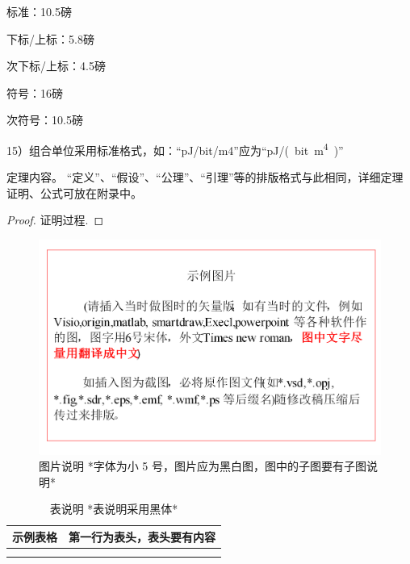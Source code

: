 \documentclass{cjc}
\begin{document}
标准：10.5磅

下标/上标：5.8磅

次下标/上标：4.5磅

符号：16磅

次符号：10.5磅

15）组合单位采用标准格式，如：“pJ/bit/m4”应为“\si{pJ/(bit.m^4)}”


\begin{theorem}
  定理内容。
  “定义”、“假设”、“公理”、“引理”等的排版格式与此相同，详细定理证明、公式可放在附录中。
\end{theorem}

\begin{proof}
  证明过程.
\end{proof}

\begin{figure}[htb]
  \centering
  \includegraphics[width=\linewidth]{example-fig.pdf}
  \caption{图片说明 *字体为小 5 号，图片应为黑白图，图中的子图要有子图说明*}
\end{figure}

\begin{table}[htb]
  \centering
  \caption{表说明 *表说明采用黑体*}
  \small
  \begin{tabular}{cc}
    \toprule
    示例表格 & 第一行为表头，表头要有内容 \\
    \midrule
    & \\
    \midrule
    & \\
    \bottomrule
  \end{tabular}
\end{table}

\end{document}
